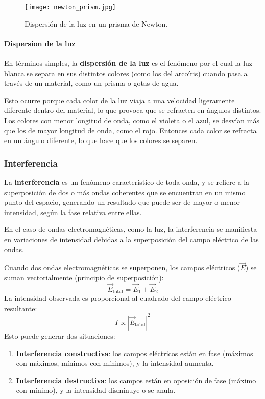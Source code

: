 \begin{wrapfigure}{r}{0.25\textwidth}
  \centering
  \texttt{[image: newton\_prism.jpg]}
  \caption{Dispersión de la luz en un prisma de Newton.}
  \label{fig:newton_prism}
\end{wrapfigure}
\paragraph{Dispersion de la luz}

En términos simples, la \textbf{dispersión de la luz} es el fenómeno por el cual la luz blanca se separa en sus distintos colores (como los del arcoíris) cuando pasa a través de un material, como un prisma o gotas de agua.

Esto ocurre porque cada color de la luz viaja a una velocidad ligeramente diferente dentro del material, lo que provoca que se refracten en ángulos distintos. Los colores con menor longitud de onda, como el violeta o el azul, se desvían más que los de mayor longitud de onda, como el rojo. Entonces cada color se refracta en un ángulo diferente, lo que hace que los colores se separen.

\subsubsection{Interferencia}

La \textbf{interferencia} es un fenómeno característico de toda onda, y se refiere a la superposición de dos o más ondas coherentes que se encuentran en un mismo punto del espacio, generando un resultado que puede ser de mayor o menor intensidad, según la fase relativa entre ellas.

En el caso de ondas electromagnéticas, como la luz, la interferencia se manifiesta en variaciones de intensidad debidas a la superposición del campo eléctrico de las ondas.

Cuando dos ondas electromagnéticas se superponen, los campos eléctricos (\(\vec{E}\)) se suman vectorialmente (principio de superposición):
\[
\vec{E}_{\text{total}} = \vec{E}_1 + \vec{E}_2
\]
La intensidad observada es proporcional al cuadrado del campo eléctrico resultante:
\[
I \propto |\vec{E}_{\text{total}}|^2
\]
Esto puede generar dos situaciones:
\begin{enumerate}
  \item \textbf{Interferencia constructiva}: los campos eléctricos están en fase (máximos con máximos, mínimos con mínimos), y la intensidad aumenta.
  \item \textbf{Interferencia destructiva}: los campos están en oposición de fase (máximo con mínimo), y la intensidad disminuye o se anula.
\end{enumerate}

